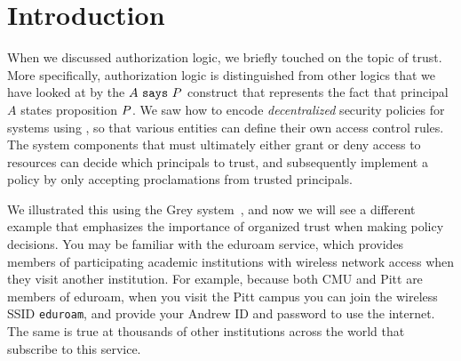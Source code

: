 \documentclass[11pt,twoside]{scrartcl}
\begin{document}
\maketitle
\thispagestyle{empty}


\section{Introduction}

When we discussed authorization logic, we briefly touched on the topic of trust. More specifically, authorization logic is distinguished from other logics that we have looked at by the $A~\texttt{\upshape says}~P$ construct that represents the fact that principal $A$ states proposition $P$. We saw how to encode \emph{decentralized} security policies for systems using , so that various entities can define their own access control rules. The system components that must ultimately either grant or deny access to resources can decide which principals to trust, and subsequently implement a policy by only accepting  proclamations from trusted principals.

We illustrated this using the Grey system~\cite{Bauer2005}, and now we will see a different example that emphasizes the importance of organized trust when making policy decisions. You may be familiar with the eduroam service, which provides members of participating academic institutions with wireless network access when they visit another institution. For example, because both CMU and Pitt are members of eduroam, when you visit the Pitt campus you can join the wireless SSID \verb'eduroam', and provide your Andrew ID and password to use the internet. The same is true at thousands of other institutions across the world that subscribe to this service.
\end{document}

